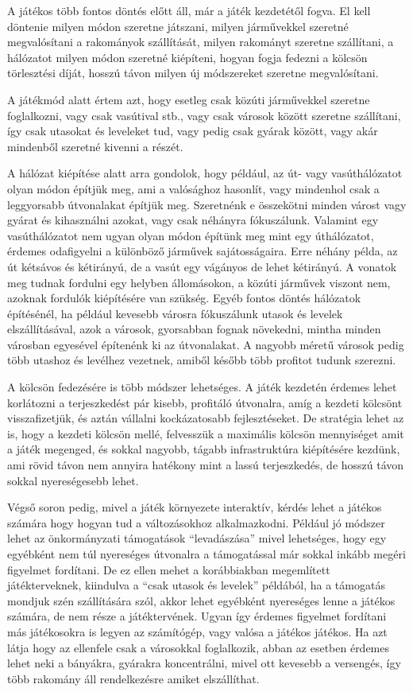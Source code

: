
A játékos több fontos döntés előtt áll, már a játék kezdetétől fogva. El kell döntenie milyen módon szeretne játszani, milyen járművekkel szeretné megvalósítani a rakományok szállítását, milyen rakományt szeretne szállítani, a hálózatot milyen módon szeretné kiépíteni, hogyan fogja fedezni a kölcsön törlesztési díját, hosszú távon milyen új módszereket szeretne megvalósítani.

A játékmód alatt értem azt, hogy esetleg csak közúti járművekkel szeretne foglalkozni, vagy csak vasútival stb., vagy csak városok között szeretne szállítani, így csak utasokat és leveleket tud, vagy pedig csak gyárak között, vagy akár mindenből szeretné kivenni a részét.

A hálózat kiépítése alatt arra gondolok, hogy például, az út- vagy vasúthálózatot olyan módon építjük meg, ami a valósághoz hasonlít, vagy mindenhol csak a leggyorsabb útvonalakat építjük meg. Szeretnénk e összekötni minden várost vagy gyárat és kihasználni azokat, vagy csak néhányra fókuszálunk. Valamint egy vasúthálózatot nem ugyan olyan módon építünk meg mint egy úthálózatot, érdemes odafigyelni a különböző járművek sajátosságaira. Erre néhány példa, az út kétsávos és kétirányú, de a vasút egy vágányos de lehet kétirányú. A vonatok meg tudnak fordulni egy helyben állomásokon, a közúti járművek viszont nem, azoknak fordulók kiépítésére van szükség. Egyéb fontos döntés hálózatok építésénél, ha például kevesebb városra fókuszálunk utasok és levelek elszállításával, azok a városok, gyorsabban fognak növekedni, mintha minden városban egyesével építenénk ki az útvonalakat. A nagyobb méretű városok pedig több utashoz és levélhez vezetnek, amiből később több profitot tudunk szerezni.

A kölcsön fedezésére is több módszer lehetséges. A játék kezdetén érdemes lehet korlátozni a terjeszkedést pár kisebb, profitáló útvonalra, amíg a kezdeti kölcsönt visszafizetjük, és aztán vállalni kockázatosabb fejlesztéseket. De stratégia lehet az is, hogy a kezdeti kölcsön mellé, felvesszük a maximális kölcsön mennyiséget amit a játék megenged, és sokkal nagyobb, tágabb infrastruktúra kiépítésére kezdünk, ami rövid távon nem annyira hatékony mint a lassú terjeszkedés, de hosszú távon sokkal nyereségesebb lehet.

Végső soron pedig, mivel a játék környezete interaktív, kérdés lehet a játékos számára hogy hogyan tud a változásokhoz alkalmazkodni. Például jó módszer lehet az önkormányzati támogatások “levadászása” mivel lehetséges, hogy egy egyébként nem túl nyereséges útvonalra a támogatással már sokkal inkább megéri figyelmet fordítani. De ez ellen mehet a korábbiakban megemlített játékterveknek, kiindulva a “csak utasok és levelek” példából, ha a támogatás mondjuk szén szállítására szól, akkor lehet egyébként nyereséges lenne a játékos számára, de nem része a játéktervének. Ugyan így érdemes figyelmet fordítani más játékosokra is legyen az számítógép, vagy valósa a játékos játékos. Ha azt látja hogy az ellenfele csak a városokkal foglalkozik, abban az esetben érdemes lehet neki a bányákra, gyárakra koncentrálni, mivel ott kevesebb a versengés, így több rakomány áll rendelkezésre amiket elszállíthat.



